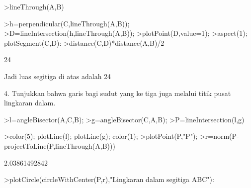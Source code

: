 \documentclass[a4paper,10pt]{article}
\begin{document}
\begin{eulernotebook}
\begin{eulercomment}
\begin{eulercomment}
\begin{eulercomment}
\begin{eulercomment}
\begin{eulercomment}
\begin{eulercomment}
\begin{eulercomment}
\begin{eulercomment}
\begin{eulercomment}
\begin{eulercomment}
\begin{eulercomment}
\begin{eulercomment}
\begin{eulercomment}
\begin{eulercomment}
\begin{eulercomment}
\begin{eulercomment}
\begin{eulercomment}
\begin{eulercomment}
\begin{eulercomment}
\begin{eulercomment}
\begin{eulercomment}
\begin{eulercomment}
\begin{eulercomment}
\begin{eulercomment}
\begin{eulercomment}
\begin{eulercomment}
\begin{eulercomment}
\begin{eulercomment}
\begin{eulercomment}
\begin{eulercomment}
\begin{eulercomment}
\begin{eulercomment}
\begin{eulercomment}
\begin{eulercomment}
\begin{eulercomment}
\begin{eulercomment}
\begin{eulercomment}
\begin{eulercomment}
\begin{eulerprompt}
>lineThrough(A,B)
\end{eulerprompt}
\begin{euleroutput}
  [4,  4,  -8]
\end{euleroutput}
\begin{eulerprompt}
>h=perpendicular(C,lineThrough(A,B));
>D=lineIntersection(h,lineThrough(A,B));
>plotPoint(D,value=1);
>aspect(1); plotSegment(C,D):
>distance(C,D)*distance(A,B)/2
\end{eulerprompt}
\begin{euleroutput}
  24
\end{euleroutput}
\begin{eulercomment}
Jadi luas segitiga di atas adalah 24

4. Tunjukkan bahwa garis bagi sudut yang ke tiga juga melalui titik
pusat lingkaran dalam.
\end{eulercomment}
\begin{eulerprompt}
>l=angleBisector(A,C,B);
>g=angleBisector(C,A,B);
>P=lineIntersection(l,g)
\end{eulerprompt}
\begin{euleroutput}
  [0.441518,  0.441518]
\end{euleroutput}
\begin{eulerprompt}
>color(5); plotLine(l); plotLine(g); color(1);
>plotPoint(P,"P");
>r=norm(P-projectToLine(P,lineThrough(A,B)))
\end{eulerprompt}
\begin{euleroutput}
  2.03861492842
\end{euleroutput}
\begin{eulerprompt}
>plotCircle(circleWithCenter(P,r),"Lingkaran dalam segitiga ABC"):

\end{eulerprompt}
\end{eulercomment}
\end{eulercomment}
\end{eulercomment}
\end{eulercomment}
\end{eulercomment}
\end{eulercomment}
\end{eulercomment}
\end{eulercomment}
\end{eulercomment}
\end{eulercomment}
\end{eulercomment}
\end{eulercomment}
\end{eulercomment}
\end{eulercomment}
\end{eulercomment}
\end{eulercomment}
\end{eulercomment}
\end{eulercomment}
\end{eulercomment}
\end{eulercomment}
\end{eulercomment}
\end{eulercomment}
\end{eulercomment}
\end{eulercomment}
\end{eulercomment}
\end{eulercomment}
\end{eulercomment}
\end{eulercomment}
\end{eulercomment}
\end{eulercomment}
\end{eulercomment}
\end{eulercomment}
\end{eulercomment}
\end{eulercomment}
\end{eulercomment}
\end{eulercomment}
\end{eulercomment}
\end{eulercomment}
\end{eulernotebook}
\end{document}
